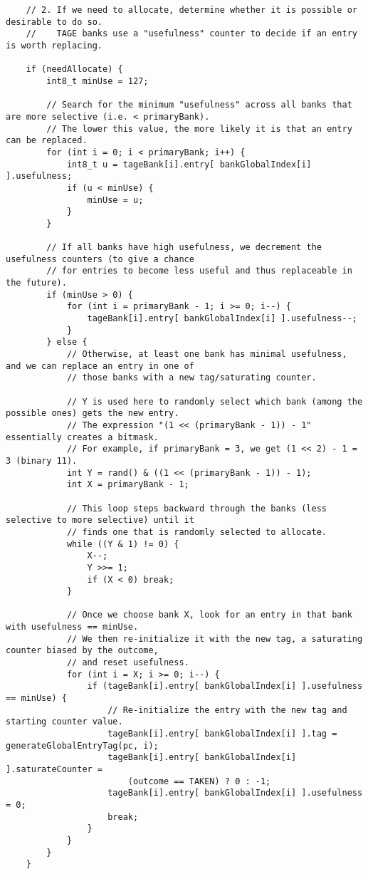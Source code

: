 \documentclass[11pt]{article}
\begin{document}
\begin{verbatim}
    // 2. If we need to allocate, determine whether it is possible or desirable to do so.
    //    TAGE banks use a "usefulness" counter to decide if an entry is worth replacing.

    if (needAllocate) {
        int8_t minUse = 127;

        // Search for the minimum "usefulness" across all banks that are more selective (i.e. < primaryBank).
        // The lower this value, the more likely it is that an entry can be replaced.
        for (int i = 0; i < primaryBank; i++) {
            int8_t u = tageBank[i].entry[ bankGlobalIndex[i] ].usefulness;
            if (u < minUse) {
                minUse = u;
            }
        }

        // If all banks have high usefulness, we decrement the usefulness counters (to give a chance
        // for entries to become less useful and thus replaceable in the future).
        if (minUse > 0) {
            for (int i = primaryBank - 1; i >= 0; i--) {
                tageBank[i].entry[ bankGlobalIndex[i] ].usefulness--;
            }
        } else {
            // Otherwise, at least one bank has minimal usefulness, and we can replace an entry in one of
            // those banks with a new tag/saturating counter.

            // Y is used here to randomly select which bank (among the possible ones) gets the new entry.
            // The expression "(1 << (primaryBank - 1)) - 1" essentially creates a bitmask.
            // For example, if primaryBank = 3, we get (1 << 2) - 1 = 3 (binary 11).
            int Y = rand() & ((1 << (primaryBank - 1)) - 1);
            int X = primaryBank - 1;

            // This loop steps backward through the banks (less selective to more selective) until it
            // finds one that is randomly selected to allocate.
            while ((Y & 1) != 0) {
                X--;
                Y >>= 1;
                if (X < 0) break;
            }

            // Once we choose bank X, look for an entry in that bank with usefulness == minUse.
            // We then re-initialize it with the new tag, a saturating counter biased by the outcome,
            // and reset usefulness.
            for (int i = X; i >= 0; i--) {
                if (tageBank[i].entry[ bankGlobalIndex[i] ].usefulness == minUse) {
                    // Re-initialize the entry with the new tag and starting counter value.
                    tageBank[i].entry[ bankGlobalIndex[i] ].tag = generateGlobalEntryTag(pc, i);
                    tageBank[i].entry[ bankGlobalIndex[i] ].saturateCounter =
                        (outcome == TAKEN) ? 0 : -1;
                    tageBank[i].entry[ bankGlobalIndex[i] ].usefulness = 0;
                    break;
                }
            }
        }
    }


\end{verbatim}
\end{document}
